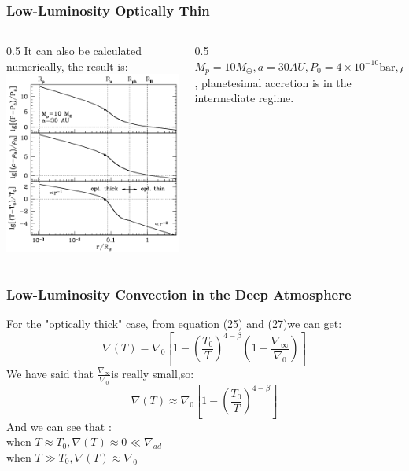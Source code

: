 \documentclass{beamer}
\begin{document}
\begin{frame}
\frametitle{Low-Luminosity Optically Thin}
\begin{columns}[t] 
\begin{column}{0.5\textwidth} 
It can also be calculated numerically, the result is:
\vspace{-0.1cm}
\includegraphics[width=\textwidth]{Low-Luminosity Optically Thin.png}
\end{column} 
\begin{column}{0.5\textwidth}
$M_p=10 M_{\oplus},a=30AU,P_0 =4 \times 10^{-10} \text{bar}, \rho_0 =2 \times 10^{-13} \text{g cm}^{-3},T_0= 55 \text{K}, \alpha=0, \beta=1, \gamma = \frac{7}{5}, \kappa_0=0.1 \text{cm}^2 \text{g}^{-1}$, planetesimal accretion is in the intermediate regime.
\end{column} 
\end{columns}
\end{frame}

\begin{frame}
\frametitle{Low-Luminosity Convection in the Deep Atmosphere}
For the "optically thick" case, from equation (25) and (27)we can get:
\begin{equation}
\nabla(T)=\nabla_0[1-(\frac{T_0}{T})^{4-\beta}(1-\frac{\nabla_{\infty}}{\nabla_0})]
\end{equation}
We have said that $\frac{\nabla_{\infty}}{\nabla_0}$is really small,so:
\begin{equation}
\nabla(T) \approx \nabla_0[1-(\frac{T_0}{T})^{4-\beta}]
\end{equation}
And we can see that :\\
when $T \approx T_0 , \nabla(T) \approx 0 \ll \nabla_{ad}$\\
when $T \gg T_0 , \nabla(T) \approx \nabla_0 $
\end{frame}
\end{document}
